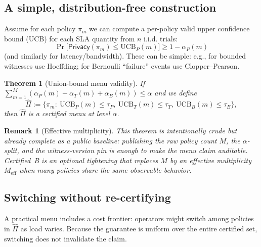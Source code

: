 \documentclass[11pt]{article}
\newtheorem{theorem}{Theorem}
\newtheorem{remark}{Remark}
\begin{document}
\subsection{A simple, distribution-free construction}
Assume for each policy $\pi_m$ we can compute a per-policy valid upper confidence bound (UCB) for each SLA quantity from $n$ i.i.d. trials:
\[
\Pr\big[\textsf{Privacy}(\pi_m)\le \mathrm{UCB}_P(m)\big]\ge 1-\alpha_P(m)
\]
(and similarly for latency/bandwidth).
These can be simple: e.g., for bounded witnesses use Hoeffding; for Bernoulli ``failure'' events use Clopper--Pearson.

\begin{theorem}[Union-bound menu validity]
If $\sum_{m=1}^M (\alpha_P(m)+\alpha_T(m)+\alpha_B(m))\le \alpha$ and we define
\[
\widehat\Pi := \{\pi_m:\ \mathrm{UCB}_P(m)\le \tau_P,\ \mathrm{UCB}_T(m)\le \tau_T,\ \mathrm{UCB}_B(m)\le \tau_B\},
\]
then $\widehat\Pi$ is a certified menu at level $\alpha$.
\end{theorem}

\begin{remark}[Effective multiplicity]
This theorem is intentionally crude but already complete as a public baseline: publishing the raw policy count $M$, the $\alpha$-split, and the witness-version pin is enough to make the menu claim auditable. Certified~B is an optional tightening that replaces $M$ by an effective multiplicity $M_{\mathrm{eff}}$ when many policies share the same observable behavior.
\end{remark}

\subsection{Switching without re-certifying}
A practical menu includes a cost frontier:
operators might switch among policies in $\widehat\Pi$ as load varies.
Because the guarantee is uniform over the entire certified set, switching does not invalidate the claim.
\end{document}
